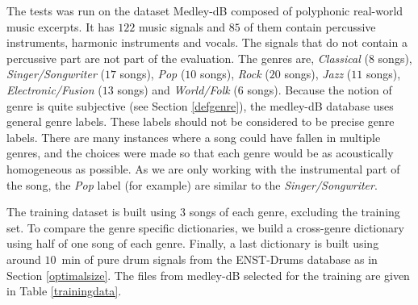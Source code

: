 \documentclass{article}
\begin{document}
The tests was run on the dataset Medley-dB \cite{bittner2014medleydb} composed of polyphonic real-world music excerpts. It has $122$ music signals and $85$ of them contain percussive instruments, harmonic instruments and vocals. The signals that do not contain a percussive part are not part of the evaluation. The genres are, \emph{Classical} ($8$ songs), \emph{Singer/Songwriter} ($17$ songs), \emph{Pop} ($10$ songs), \emph{Rock} ($20$ songs), \emph{Jazz} ($11$ songs), \emph{Electronic/Fusion} ($13$ songs) and \emph{World/Folk} ($6$ songs). Because the notion of genre is quite subjective (see Section \ref{defgenre}), the medley-dB database uses general genre labels. These labels should not be considered to be precise genre labels. There are many instances where a song could have fallen in multiple genres, and the choices were made so that each genre would be as acoustically homogeneous as possible. As we are only working with the instrumental part of the song, the \emph{Pop} label (for example) are similar to the \emph{Singer/Songwriter}.

The training dataset is built using $3$ songs of each genre, excluding the training set. To compare the genre specific dictionaries, we build a cross-genre dictionary using half of one song of each genre. Finally, a last dictionary is built using around $10$~min of pure drum signals from the ENST-Drums database as in Section \ref{optimalsize}. The files from medley-dB selected for the training are given in Table \ref{trainingdata}. 
\end{document}
